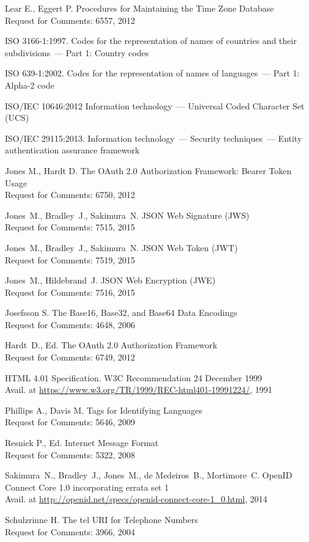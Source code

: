 \begin{thebibliography}{99}
Lear E., Eggert P.
Procedures for Maintaining the Time Zone Database\\
{\small Request for Comments: 6557, 2012}

ISO 3166-1:1997. Codes for the representation of names of
countries and their subdivisions~--- Part 1: Country codes

ISO 639-1:2002. Codes for the representation of names of languages~---
Part 1: Alpha-2 code

ISO/IEC 10646:2012 Information technology~--- Universal Coded Character 
Set (UCS)

ISO/IEC 29115:2013. Information technology~---
Security techniques~--– Entity authentication assurance framework

Jones M., Hardt D.
The OAuth 2.0 Authorization Framework: Bearer Token Usage\\
{\small Request for Comments: 6750, 2012}

Jones~M., Bradley~J., Sakimura~N. 
JSON Web Signature (JWS)\\
{\small Request for Comments: 7515, 2015}

Jones~M., Bradley~J., Sakimura~N. 
JSON Web Token (JWT)\\
{\small Request for Comments: 7519, 2015}

Jones~M., Hildebrand~J. 
JSON Web Encryption (JWE)\\
{\small Request for Comments: 7516, 2015}

Josefsson S. 
The Base16, Base32, and Base64 Data Encodings\\
{\small Request for Comments: 4648, 2006}

Hardt~D., Ed.
The OAuth 2.0 Authorization Framework\\
{\small Request for Comments: 6749, 2012}

HTML 4.01 Specification. 
W3C Recommendation 24 December 1999\\
{\small Avail. at 
\url{https://www.w3.org/TR/1999/REC-html401-19991224/}, 1991}

Phillips A., Davis M. 
Tags for Identifying Languages\\
{\small Request for Comments: 5646, 2009}

Resnick P., Ed. 
Internet Message Format\\
{\small Request for Comments: 5322, 2008}

Sakimura~N., Bradley~J., Jones~M., de Medeiros~B., Mortimore~C. 
OpenID Connect Core 1.0 incorporating errata set 1\\
{\small Avail. at 
\url{http://openid.net/specs/openid-connect-core-1_0.html}, 2014}

Schulzrinne H. 
The tel URI for Telephone Numbers\\
{\small Request for Comments: 3966, 2004}

\end{thebibliography}
